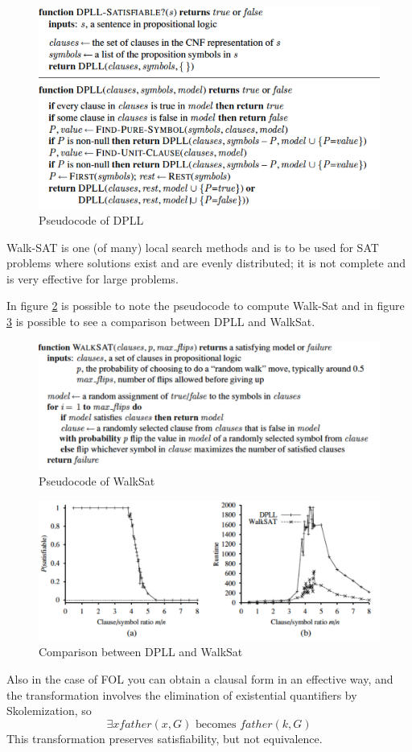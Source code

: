 \begin{figure}
	\includegraphics[width=\textwidth]{Images/dpll}
	\caption{Pseudocode of DPLL}
	\label{img:dpllPseudo}
\end{figure}

Walk-SAT is one (of many) local search methods and is to be used for SAT problems
where solutions exist and are evenly distributed; it is not complete and is 
very effective for large problems.

In figure \ref{img:walkSat} is possible to note the pseudocode to compute Walk-Sat and 
in figure \ref{img:comparisonDPLL} is possible to see a comparison between DPLL and WalkSat.

\begin{figure}
	\includegraphics[width=\textwidth]{Images/walksat}
	\caption{Pseudocode of WalkSat}
	\label{img:walkSat}
\end{figure}

\begin{figure}
	\includegraphics[width=\textwidth]{Images/dpllComparison}
	\caption{Comparison between DPLL and WalkSat}
	\label{img:comparisonDPLL}
\end{figure}
Also in the case of FOL you can obtain a clausal form in an effective way, and the 
transformation involves the elimination of existential quantifiers by Skolemization, so
\[ \exists x father(x, G) \text{ becomes } father(k, G) \]
This transformation preserves satisfiability, but not equivalence.

